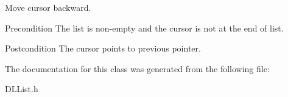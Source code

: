 Move cursor backward. 

\begin{DoxyPrecond}{Precondition}
The list is non-\/empty and the cursor is not at the end of list. 
\end{DoxyPrecond}
\begin{DoxyPostcond}{Postcondition}
The cursor points to previous pointer. 
\end{DoxyPostcond}


The documentation for this class was generated from the following file\-:\begin{DoxyCompactItemize}
\item 
D\-L\-List.\-h\end{DoxyCompactItemize}
